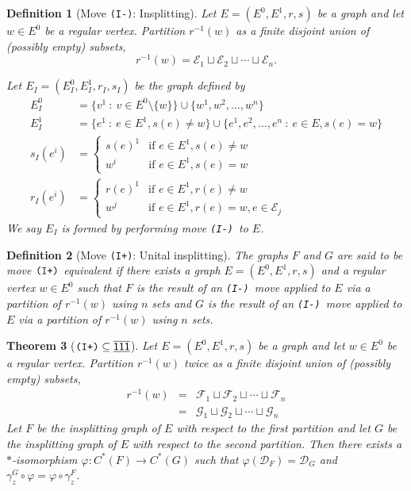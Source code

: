 \documentclass[12pt]{amsbook}%
\renewcommand{\phi}{\varphi}
\newtheorem{theor}{Theorem}[section]
\theoremstyle{defin}
\newtheorem{defin}[theor]{Definition}
\theoremstyle{remark}
\numberwithin{equation}{chapter}
\numberwithin{theor}{section}
\newcommand{\xyzrel}[1]{\mbox{$\overline{\underline{\mathsf{ #1}}}$}}
\newcommand{\IIIm}{\mbox{\texttt{\textup{(I-)}}}}
\newcommand{\IIIp}{\mbox{\texttt{\textup{(I+)}}}}
\begin{document}
\begin{defin}[Move \IIIm:  Insplitting] \label{IIIm}\index{Im@\IIIm}
Let $E = ( E^0, E^1, r , s )$ be a graph and let $w \in E^0$ be a regular vertex.  Partition $r^{-1} (w)$ as a finite disjoint union of (possibly empty) subsets,
\[
r^{-1} (w) = \mathcal{E}_1 \sqcup \mathcal{E}_2 \sqcup \cdots \sqcup \mathcal{E}_n.
\]

Let $E_I = ( E_I^0 , E_I^1, r_{I} , s_{I} )$ be the graph defined by 
\begin{align*}
E^0_I &= \{ v^1 \ : \ v \in E^0 \setminus \{ w \} \} \cup \{ w^1, w^2, \ldots, w^n \} \\
E^1_I &= \{ e^1 \ : \ e \in E^1, s (e) \neq w \} \cup \{ e^1 , e^2 , \ldots, e^n \ : \ e \in E , s (e)  = w \} \\
s_{I}(e^i ) &= \begin{cases} s(e)^1 &\text{if $e \in E^1, s (e) \neq w$} \\ w^i &\text{if $e \in E^1, s (e) = w$} \end{cases} \\
r_{I}(e^i ) &= \begin{cases} r(e)^1 &\text{if $e \in E^1, r (e) \neq w$} \\ w^j &\text{if $e \in E^1, r (e) = w, e \in \mathcal{E}_j$} \end{cases}
\end{align*}
We  say $E_I$ is formed by
performing move \IIIm\ to $E$.
\end{defin}




\begin{defin}[Move \IIIp:  Unital insplitting] \label{IIIp}\index{Ip@\IIIp}
The graphs $F$ and $G$ are said to be \emph{move $\mbox{\texttt{\textup{(I+)}}}$ equivalent} if there exists a graph $E=(E^0,E^1,r,s)$ and a regular vertex $w\in E^0$ such that $F$ is the result of an \IIIm\ move applied to  $E$ via a partition of $r^{-1}(w)$ using $n$ sets and $G$ is the result of an \IIIm\ move applied to  $E$ via a partition of $r^{-1}(w)$ using $n$ sets.
\end{defin}



\begin{theor}[$\IIIp\subseteq \xyzrel{111}$]\label{thm:insplittingplus}
Let $E = ( E^0, E^1, r , s )$ be a graph and let $w \in E^0$ be a regular vertex.  Partition $r^{-1} (w)$ twice as a finite disjoint union of (possibly empty) subsets,
\begin{eqnarray*}
r^{-1} (w) &=& \mathcal{F}_1 \sqcup \mathcal{F}_2 \sqcup \cdots \sqcup \mathcal{F}_n\\
&=& \mathcal{G}_1 \sqcup \mathcal{G}_2 \sqcup \cdots \sqcup \mathcal{G}_n  
\end{eqnarray*}
Let $F$ be the insplitting graph of $E$ with respect to the first partition and let $G$ be the insplitting graph of $E$ with respect to the second partition.  Then there exists a $*$-isomorphism $\phi \colon C^*(F) \to C^*(G)$ such that $\phi ( \mathcal{D}_F ) = \mathcal{D}_G$ and $\gamma_z^G \circ \phi = \phi \circ \gamma_z^F$. 
\end{theor}
\end{document}
